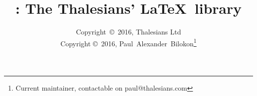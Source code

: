 

\documentclass[10pt]{article}

\usepackage[usecolour=true, useimakeidx=true]{lathalesians-commons}
\usepackage[usegeometry=true]{lathalesians-formatting}
\usepackage{lathalesians-font}
\usepackage{lathalesians-code}
\usepackage{lathalesians-analysis}
\usepackage{lathalesians-linear}
\usepackage{lathalesians-probability}
\usepackage{lathalesians-categories}
\usepackage{lathalesians-theorems}
\usepackage{lathalesians-domains}
\usepackage{lathalesians-computability}

\usepackage{longtable}
\usepackage{nomencl}
\usepackage{url}

\title{\LaThalesians: The Thalesians' \LaTeX~library}
\author{Copyright~\copyright~2016, Thalesians Ltd \\
Copyright \copyright~2016, Paul~Alexander~Bilokon\footnote{Current maintainer, contactable on \textsf{paul@thalesians.com}}}

\makeindex[name=general, title=Subject index]
\makeindex[name=authors, title=Index of authors]

\makenomenclature



\maketitle

\tableofcontents

\section{Overview}

The \LaThalesians library comprises a heterogeneous collection of \LaTeX~packages, which facilitate the typesetting of the Thalesians' work in mathematics, computer science, and finance. It was originally developed by Paul~Bilokon to support his academic and professional work and the library's scope still reflects some of his personal biases, \viz:
\begin{itemize}
\item mathematical finance,
\item econometrics,
\item programming,
\item scientific computing,
\item algorithms,
\item statistics,
\item stochastic analysis,
\item probability theory,
\item domain theory,
\item computability theory.
\end{itemize}

